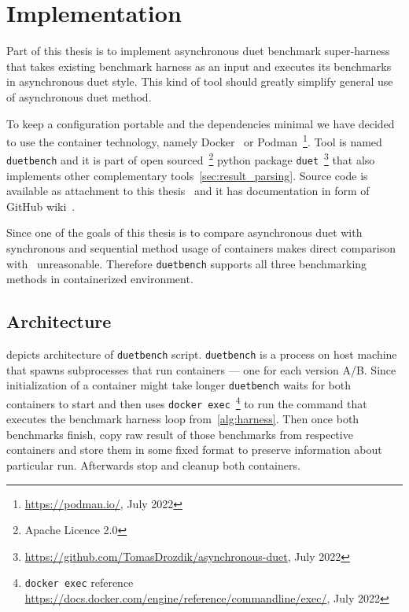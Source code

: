 \chapter{Implementation}

Part of this thesis is to implement asynchronous duet benchmark super-harness that takes existing benchmark harness as an input and executes its benchmarks in asynchronous duet style.
This kind of tool should greatly simplify general use of asynchronous duet method.

To keep a configuration portable and the dependencies minimal we have decided to use the container technology, namely Docker~\cite{merkel2014docker} or Podman~\footnote{\url{https://podman.io/}, July 2022}.
Tool is named \lstinline{duetbench} and it is part of open sourced~\footnote{Apache Licence 2.0} python package \lstinline{duet}~\footnote{\url{https://github.com/TomasDrozdik/asynchronous-duet}, July 2022} that also implements other complementary tools~\cref{sec:result_parsing}.
Source code is available as attachment to this thesis~ and it has documentation in form of GitHub wiki~\cite{wiki}.

Since one of the goals of this thesis is to compare asynchronous duet with synchronous and sequential method usage of containers makes direct comparison with~\citet{bulej2020duet} unreasonable.
Therefore \lstinline{duetbench} supports all three benchmarking methods in containerized environment.

\section{Architecture}

 depicts architecture of \lstinline{duetbench} script.
\lstinline{duetbench} is a process on host machine that spawns subprocesses that run containers --- one for each version A/B.
Since initialization of a container might take longer \lstinline{duetbench} waits for both containers to start and then uses \lstinline{docker exec}~\footnote{\lstinline{docker exec} reference \url{https://docs.docker.com/engine/reference/commandline/exec/}, July 2022} to run the command that executes the benchmark harness loop from~\cref{alg:harness}.
Then once both benchmarks finish, copy raw result of those benchmarks from respective containers and store them in some fixed format to preserve information about particular run.
Afterwards stop and cleanup both containers.

